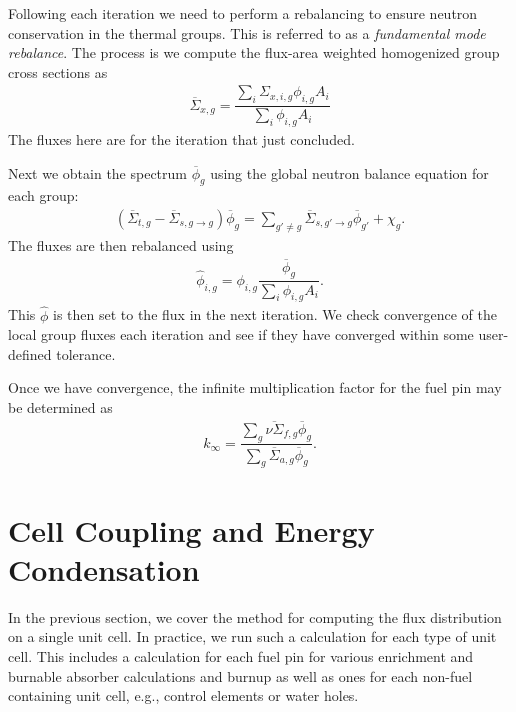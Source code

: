 Following each iteration we need to perform a rebalancing to ensure neutron conservation in the thermal groups. This is referred to as a \emph{fundamental mode rebalance}. The process is we compute the flux-area weighted homogenized group cross sections as
\begin{align}
  \overline{\Sigma}_{x,g} = \dfrac{ \displaystyle\sum_i \Sigma_{x,i,g} \phi_{i,g} A_i }{ \displaystyle\sum_i \phi_{i,g} A_i } 
\end{align}
The fluxes here are for the iteration that just concluded.

Next we obtain the spectrum $\overline{\phi}_g$ using the global neutron balance equation for each group:
\begin{align}
  ( \overline{\Sigma}_{t,g} - \overline{\Sigma}_{s,g \rightarrow g } ) \overline{\phi}_g = \sum_{g' \ne g } \overline{\Sigma}_{s,g' \rightarrow g } \overline{\phi}_{g'} + \chi_g .
\end{align}
The fluxes are then rebalanced using
\begin{align}
  \hat{\phi}_{i,g} = \phi_{i,g} \dfrac{ \overline{\phi}_g }{ \displaystyle\sum_i \phi_{i,g} A_i } .
\end{align}
This $\hat{\phi}$ is then set to the flux in the next iteration. We check convergence of the local group fluxes each iteration and see if they have converged within some user-defined tolerance.

Once we have convergence, the infinite multiplication factor for the fuel pin may be determined as
\begin{align}
  k_\infty = \dfrac{ \displaystyle\sum_g \overline{ \nu \Sigma }_{f,g} \overline{\phi}_g }{ \displaystyle\sum_g \overline{ \Sigma }_{a,g} \overline{\phi}_g } .
\end{align}





\section{Cell Coupling and Energy Condensation}

In the previous section, we cover the method for computing the flux distribution on a single unit cell. In practice, we run such a calculation for each type of unit cell. This includes a calculation for each fuel pin for various enrichment and burnable absorber calculations and burnup as well as ones for each non-fuel containing unit cell, e.g., control elements or water holes.

